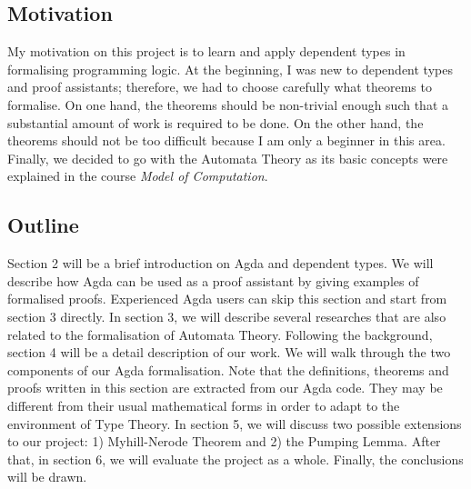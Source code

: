 \subsection{Motivation}
\par My motivation on this project is to learn and apply
dependent types in formalising programming logic. At the beginning, I
was new to dependent types and proof assistants; therefore, we
had to choose carefully what theorems to formalise. On one hand, the theorems
should be non-trivial enough such that a substantial amount of work is required
to be done. On the other hand, the theorems should not be too
difficult because I am only a beginner in this area. Finally, we
decided to go with the Automata Theory as its basic concepts were
explained in the course \textit{Model of Computation}. 


\subsection{Outline}
\par Section 2 will be a brief introduction on Agda and
dependent types. We will describe how Agda can be used as a proof
assistant by giving examples of formalised proofs. Experienced Agda
users can skip this section and start from section 3 directly. In
section 3, we will describe several researches
that are also related to the formalisation of Automata
Theory. Following the background, section 4 will be a detail description of our
work. We will walk through the two components of our Agda
formalisation. Note that the definitions,
theorems and proofs written in this section are extracted from our
Agda code. They may be different from
their usual mathematical forms in order to adapt to the environment of
Type Theory. In section 5, we will discuss two possible extensions
to our project: 1) Myhill-Nerode Theorem and 2) the Pumping
Lemma. After that, in section 6, we will evaluate the project as a
whole. Finally, the conclusions will be drawn. 